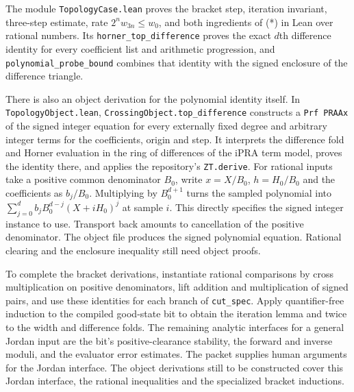 The module \texttt{TopologyCase.lean} proves the bracket step, iteration
invariant, three-step estimate, rate $2^n w_{3n}\le w_0$, and both ingredients of (*) in Lean over rational numbers.
Its \texttt{horner\_top\_difference} proves the exact $d$th difference
identity for every coefficient list and arithmetic progression, and
\texttt{polynomial\_probe\_bound} combines that identity with the signed
enclosure of the difference triangle.

There is also an object derivation for the polynomial identity itself.
In \texttt{TopologyObject.lean}, \texttt{CrossingObject.top\_difference}
constructs a \texttt{Prf PRAAx} of the signed integer equation for every
externally fixed degree and arbitrary integer terms for the coefficients,
origin and step. It interprets the difference fold and Horner evaluation in
the ring of differences of the iPRA term model, proves the identity there,
and applies the repository's \texttt{ZT.derive}. For rational inputs take
a positive common denominator $B_0$, write $x=X/B_0$, $h=H_0/B_0$ and the
coefficients as $b_j/B_0$. Multiplying by $B_0^{d+1}$ turns the sampled
polynomial into $\sum_{j=0}^d b_j B_0^{d-j}(X+iH_0)^j$ at sample $i$.
This directly specifies the signed integer instance to use. Transport back
amounts to cancellation of the positive denominator. The object file
produces the signed polynomial equation. Rational clearing and the
enclosure inequality still need object proofs.

To complete the bracket derivations,
instantiate rational comparisons by cross multiplication on positive
denominators, lift addition and multiplication of signed pairs, and
use these identities for each branch of \texttt{cut\_spec}. Apply
quantifier-free induction to the compiled good-state bit to obtain the
iteration lemma and twice to the width and difference folds. The remaining
analytic interfaces for a general Jordan input are the bit's
positive-clearance stability, the forward and inverse moduli, and the
evaluator error estimates. The packet supplies human arguments for the
Jordan interface. The object derivations still to be constructed cover this
Jordan interface, the rational inequalities and the specialized bracket
inductions.
